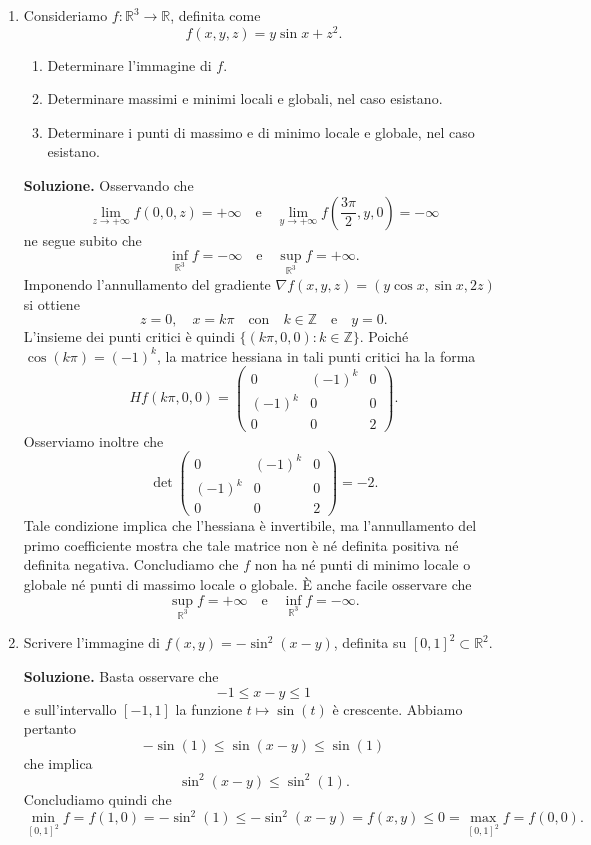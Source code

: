 \begin{enumerate}
	
	\item Consideriamo $f: \mathbb{R}^3 \to \mathbb{R}$, definita come
	\[
	f(x,y,z) = y \sin x + z^2.
	\]
	\begin{enumerate}
		\item Determinare l'immagine di $f$.
		\item Determinare massimi e minimi locali e globali, nel caso esistano.
		\item Determinare i punti di massimo e di minimo locale e globale, nel caso esistano.
	\end{enumerate}

	\textbf{Soluzione.}
		Osservando che
		\[
		\lim_{z \to +\infty} f(0,0,z) = +\infty \quad \text{e} \quad \lim_{y \to +\infty} f\left(\frac{3\pi}{2}, y, 0\right) = -\infty
		\]
		ne segue subito che
		\[
		\inf_{\mathbb{R}^3} f = -\infty \quad \text{e} \quad \sup_{\mathbb{R}^3} f = +\infty.
		\]
		Imponendo l'annullamento del gradiente $\nabla f(x,y,z) = (y \cos x, \sin x, 2z)$ si ottiene
		\[
		z = 0, \quad x = k\pi \quad \text{con} \quad k \in \mathbb{Z} \quad \text{e} \quad y = 0.
		\]
		L'insieme dei punti critici è quindi $\{(k\pi, 0, 0) : k \in \mathbb{Z}\}$. Poiché $\cos(k\pi) = (-1)^k$, la matrice hessiana in tali punti critici ha la forma
		\[
		Hf(k\pi, 0, 0) = \begin{pmatrix}
			0 & (-1)^k & 0 \\
			(-1)^k & 0 & 0 \\
			0 & 0 & 2
		\end{pmatrix}.
		\]
		Osserviamo inoltre che
		\[
		\det \begin{pmatrix}
			0 & (-1)^k & 0 \\
			(-1)^k & 0 & 0 \\
			0 & 0 & 2
		\end{pmatrix} = -2.
		\]
		Tale condizione implica che l'hessiana è invertibile, ma l'annullamento del primo coefficiente mostra che tale matrice non è né definita positiva né definita negativa. Concludiamo che $f$ non ha né punti di minimo locale o globale né punti di massimo locale o globale. È anche facile osservare che
		\[
		\sup_{\mathbb{R}^3} f = +\infty \quad \text{e} \quad \inf_{\mathbb{R}^3} f = -\infty.
		\]
	
	\item Scrivere l'immagine di $f(x,y) = -\sin^2(x - y)$, definita su $[0,1]^2 \subset \mathbb{R}^2$.
	
	\textbf{Soluzione.}
		Basta osservare che
		\[
		-1 \leq x - y \leq 1
		\]
		e sull'intervallo $[-1,1]$ la funzione $t \mapsto \sin(t)$ è crescente. Abbiamo pertanto
		\[
		-\sin(1) \leq \sin(x - y) \leq \sin(1)
		\]
		che implica
		\[
		\sin^2(x - y) \leq \sin^2(1).
		\]
		Concludiamo quindi che
		\[
		\min_{[0,1]^2} f = f(1,0) = -\sin^2(1) \leq -\sin^2(x - y) = f(x,y) \leq 0 = \max_{[0,1]^2} f = f(0,0).
		\]


\end{enumerate}
